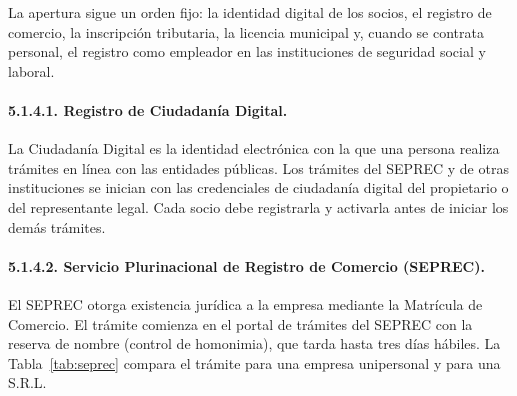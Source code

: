 La apertura sigue un orden fijo: la identidad digital de los socios, el registro de comercio, la inscripción tributaria, la licencia municipal y, cuando se contrata personal, el registro como empleador en las instituciones de seguridad social y laboral.

\paragraph{5.1.4.1. Registro de Ciudadanía Digital.}

La Ciudadanía Digital \parencite{ciudadaniadigital2026} es la identidad electrónica con la que una persona realiza trámites en línea con las entidades públicas. Los trámites del SEPREC y de otras instituciones se inician con las credenciales de ciudadanía digital del propietario o del representante legal. Cada socio debe registrarla y activarla antes de iniciar los demás trámites.

\paragraph{5.1.4.2. Servicio Plurinacional de Registro de Comercio (SEPREC).}

El SEPREC \parencite{seprec2026} otorga existencia jurídica a la empresa mediante la Matrícula de Comercio. El trámite comienza en el portal de trámites del SEPREC con la reserva de nombre (control de homonimia), que tarda hasta tres días hábiles. La Tabla~\ref{tab:seprec} compara el trámite para una empresa unipersonal y para una S.R.L.

